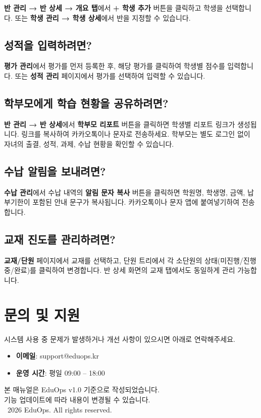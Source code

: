 \documentclass[11pt, a4paper]{article}
\newcommand{\menu}[1]{\textcolor{eduprimary}{\textbf{#1}}}
\newcommand{\btn}[1]{\colorbox{eduprimary!10}{\textcolor{eduprimary}{\textbf{#1}}}}
\begin{document}
\menu{반 관리 → 반 상세 → 개요 탭}에서 \btn{+ 학생 추가} 버튼을 클릭하고 학생을 선택합니다. 또는 \menu{학생 관리 → 학생 상세}에서 반을 지정할 수 있습니다.

\subsection{성적을 입력하려면?}

\menu{평가 관리}에서 평가를 먼저 등록한 후, 해당 평가를 클릭하여 학생별 점수를 입력합니다. 또는 \menu{성적 관리} 페이지에서 평가를 선택하여 입력할 수 있습니다.

\subsection{학부모에게 학습 현황을 공유하려면?}

\menu{반 관리 → 반 상세}에서 \btn{학부모 리포트} 버튼을 클릭하면 학생별 리포트 링크가 생성됩니다. 링크를 복사하여 카카오톡이나 문자로 전송하세요. 학부모는 별도 로그인 없이 자녀의 출결, 성적, 과제, 수납 현황을 확인할 수 있습니다.

\subsection{수납 알림을 보내려면?}

\menu{수납 관리}에서 수납 내역의 \menu{알림 문자 복사} 버튼을 클릭하면 학원명, 학생명, 금액, 납부기한이 포함된 안내 문구가 복사됩니다. 카카오톡이나 문자 앱에 붙여넣기하여 전송합니다.

\subsection{교재 진도를 관리하려면?}

\menu{교재/단원} 페이지에서 교재를 선택하고, 단원 트리에서 각 소단원의 상태(미진행/진행중/완료)를 클릭하여 변경합니다. 반 상세 화면의 교재 탭에서도 동일하게 관리 가능합니다.


\section{문의 및 지원}

시스템 사용 중 문제가 발생하거나 개선 사항이 있으시면 아래로 연락해주세요.

\begin{notebox}
\begin{itemize}[leftmargin=1.5em]
  \item \textbf{이메일}: support@eduops.kr
  \item \textbf{운영 시간}: 평일 09:00 -- 18:00
\end{itemize}
\end{notebox}

\vfill
\begin{center}
  \color{edugray}\small
  본 매뉴얼은 EduOps v1.0 기준으로 작성되었습니다.\\
  기능 업데이트에 따라 내용이 변경될 수 있습니다.\\[0.5cm]
  \textcopyright\ 2026 EduOps. All rights reserved.
\end{center}
\end{document}
